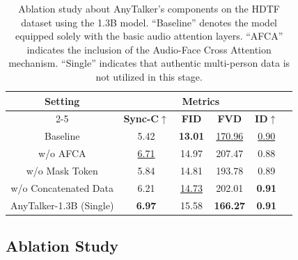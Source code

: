 \begin{table}[t]
    \centering
    \caption{
        Ablation study about AnyTalker's components on the HDTF dataset using the 1.3B model.
        ``Baseline'' denotes the model equipped solely with the basic audio attention layers. 
        ``AFCA'' indicates the inclusion of the Audio-Face Cross Attention mechanism. 
        ``Single'' indicates that authentic multi-person data is not utilized in this stage.
    }
    \small
    \begin{tabular}{cccccc}
        \toprule
        \multirow{2}{*}{\textbf{Setting}} & \multicolumn{4}{c}{\textbf{Metrics}} \\
        \cmidrule(lr){2-5}
        & \textbf{Sync-C$\uparrow$} & \textbf{FID} & \textbf{FVD} & \textbf{ID$\uparrow$} \\
        \midrule
        Baseline & 5.42 & \textbf{13.01} & \underline{170.96} & \underline{0.90} \\
        w/o AFCA & \underline{6.71} & 14.97 & 207.47 & 0.88 \\
        w/o Mask Token & 5.84 & 14.81 & 193.78 & 0.89 \\
        w/o Concatenated Data & 6.21 & \underline{14.73} & 202.01 & \textbf{0.91} \\
        AnyTalker-1.3B (Single) & \textbf{6.97} & 15.58 & \textbf{166.27} & \textbf{0.91} \\
        \bottomrule
    \end{tabular}
    \label{tab:ab-component}
\end{table}

\subsection{Ablation Study}
\label{subsec:ab}

